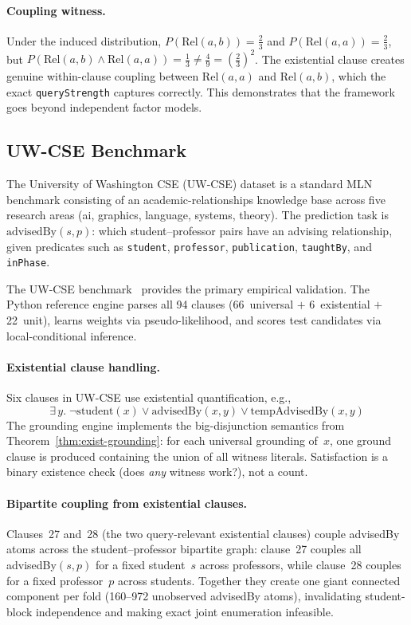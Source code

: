 \documentclass[11pt,openany]{report}
\begin{document}
\paragraph{Coupling witness.}
Under the induced distribution, $P(\mathrm{Rel}(a,b)) = \tfrac{2}{3}$
and $P(\mathrm{Rel}(a,a)) = \tfrac{2}{3}$, but
$P(\mathrm{Rel}(a,b) \land \mathrm{Rel}(a,a)) = \tfrac{1}{3}
  \neq \tfrac{4}{9} = (\tfrac{2}{3})^2$.
The existential clause creates genuine within-clause coupling between
$\mathrm{Rel}(a,a)$ and $\mathrm{Rel}(a,b)$, which the exact
\texttt{queryStrength} captures correctly.  This demonstrates that the
framework goes beyond independent factor models.

\subsection{UW-CSE Benchmark}
\label{sec:uwcse-benchmark}

The University of Washington CSE (UW-CSE) dataset is a standard MLN
benchmark consisting of an academic-relationships knowledge base across
five research areas (ai, graphics, language, systems, theory).  The
prediction task is $\mathrm{advisedBy}(s, p)$: which student--professor
pairs have an advising relationship, given predicates such as
\texttt{student}, \texttt{professor}, \texttt{publication},
\texttt{taughtBy}, and \texttt{inPhase}.

The UW-CSE benchmark~\cite{RichardsonDomingos2006} provides the primary
empirical validation.  The Python reference engine parses all 94 clauses
(66~universal $+$ 6~existential $+$ 22~unit), learns weights via
pseudo-likelihood, and scores test candidates via local-conditional
inference.

\paragraph{Existential clause handling.}
Six clauses in UW-CSE use existential quantification, e.g.,
\[
  \exists\, y.\; \neg\mathrm{student}(x) \lor
    \mathrm{advisedBy}(x, y) \lor \mathrm{tempAdvisedBy}(x, y)
\]
The grounding engine implements the big-disjunction semantics from
Theorem~\ref{thm:exist-grounding}: for each universal grounding of~$x$,
one ground clause is produced containing the union of all witness
literals.  Satisfaction is a binary existence check (does \emph{any}
witness work?), not a count.

\paragraph{Bipartite coupling from existential clauses.}
Clauses~27 and~28 (the two query-relevant existential clauses) couple
advisedBy atoms across the student--professor bipartite graph:
clause~27 couples all advisedBy$(s, p)$ for a fixed student~$s$ across
professors, while clause~28 couples for a fixed professor~$p$ across
students.  Together they create one giant connected component per fold
(160--972 unobserved advisedBy atoms), invalidating student-block
independence and making exact joint enumeration infeasible.
\end{document}

